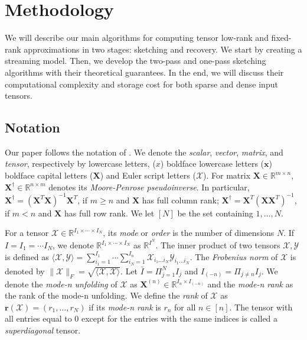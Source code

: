 \section{Methodology} 

We will describe our main algorithms for computing tensor low-rank and fixed-rank approximations in two stages: sketching and recovery. We start by creating a streaming model. Then, we develop the two-pass and one-pass sketching algorithms with their theoretical guarantees. In the end, we will discuss their computational complexity and storage cost for both sparse and dense input tensors. 

\subsection{Notation}
Our paper follows the notation of \cite{kolda2009tensor}. We denote the \textit{scalar}, \textit{vector}, \textit{matrix}, and \textit{tensor}, respectively by lowercase letters, ($x$) boldface lowercase letters ($\mathbf{x}$)  boldface capital letters  ($\mathbf{X}$)  and Euler script letters ($\mathscr{X}$). For matrix $\mathbf{X} \in \mathbb{R}^{m \times n}$, $\mathbf{X}^\dag \in \mathbb{R}^{n \times m}$ denotes its \textit{Moore-Penrose pseudoinverse}. In particular, $\mathbf{X}^\dag = (\mathbf{X}^T \mathbf{X})^{-1}\mathbf{X}^T$, if $m \geq n$ and $\mathbf{X}$ has full column rank; $\mathbf{X}^\dag = \mathbf{X}^T(\mathbf{XX}^T)^{-1}$, if $m < n$ and $\mathbf{X}$ has full row rank. We let $[N]$ be the set containing $1,\dots, N$. 

For a tensor $\mathscr{X} \in \mathbb{R}^{I_1 \times \cdots \times I_N}$, its \textit{mode} or \textit{order} is the number of dimensions $N$. If $I = I_1 = \cdots I_N$, we denote $\mathbb{R}^{I_1 \times \cdots \times I_N}$ as $\mathbb{R}^{I^N}$. The inner product of two tensors $\mathscr{X}, \mathscr{Y}$ is defined as $\langle \mathscr{X}, \mathscr{Y}\rangle = \sum_{i_1=1}^{I_1}\cdots \sum_{i_N=1}^{I_n} \mathscr{X}_{i_1\dots i_N}\mathscr{Y}_{i_1\dots i_N}$. The \textit{Frobenius norm} of $\mathscr{X}$ is denoted by $\|\mathscr{X}\|_F = \sqrt{\langle \mathscr{X}, \mathscr{X}\rangle}$. Let $\bar{I} = \Pi_{j = 1}^N I_j $ and $I_{(-n)} = \Pi_{j \neq n} I_j $. We denote the \textit{mode-n unfolding} of $\mathscr{X}$ as $\mathbf{X}^{(n)} \in \mathbb{R}^{I_n \times I_{(-n)}}$ and the \textit{mode-n rank} as the rank of the mode-n unfolding. We define the \textit{rank} of  $\mathscr{X}$ as $\mathbf{r}(\mathscr{X}) = (r_1,\dots, r_N)$ if its \textit{mode-n rank} is $r_n$ for all $n\in [n]$. The tensor with all entries equal to 0 except for the entries with the same indices is called a \textit{superdiagonal} tensor.\par 

